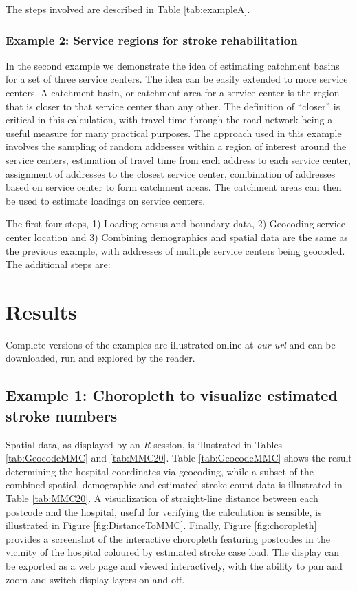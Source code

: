 \documentclass[utf8]{frontiersHLTH}
\begin{document}
The steps involved are described in Table \ref{tab:exampleA}.

\subsubsection{Example 2: Service regions for stroke
rehabilitation}\label{example-2-service-regions-for-stroke-rehabilitation}

In the second example we demonstrate the idea of estimating catchment
basins for a set of three service centers. The idea can be easily
extended to more service centers. A catchment basin, or catchment area
for a service center is the region that is closer to that service center
than any other. The definition of ``closer'' is critical in this
calculation, with travel time through the road network being a useful
measure for many practical purposes. The approach used in this example
involves the sampling of random addresses within a region of interest
around the service centers, estimation of travel time from each address
to each service center, assignment of addresses to the closest service
center, combination of addresses based on service center to form
catchment areas. The catchment areas can then be used to estimate
loadings on service centers.

The first four steps, 1) Loading census and boundary data, 2) Geocoding
service center location and 3) Combining demographics and spatial data
are the same as the previous example, with addresses of multiple service
centers being geocoded. The additional steps are:

\section{Results}
Complete versions of the examples are illustrated online at {\em our
  url} and can be downloaded, run and explored by the reader.

\subsection{Example 1: Choropleth to visualize estimated stroke numbers}
Spatial data, as displayed by an {\em R} session, is illustrated in
Tables \ref{tab:GeocodeMMC} and \ref{tab:MMC20}. Table
\ref{tab:GeocodeMMC} shows the result determining the hospital
coordinates via geocoding, while a subset of the combined spatial,
demographic and estimated stroke count data is illustrated in Table
\ref{tab:MMC20}. A visualization of straight-line distance between
each postcode and the hospital, useful for verifying the calculation
is sensible, is illustrated in Figure
\ref{fig:DistanceToMMC}. Finally, Figure \ref{fig:choropleth} provides
a screenshot of the interactive choropleth featuring postcodes in the
vicinity of the hospital coloured by estimated stroke case load. The display
can be exported as a web page and viewed interactively, with the ability to
pan and zoom and switch display layers on and off.
\end{document}
